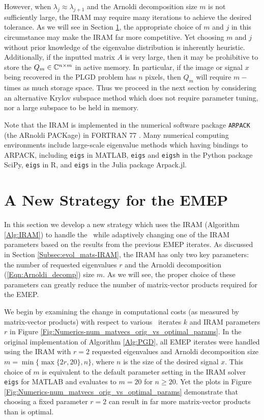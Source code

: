 However, when $\lambda_j \approx \lambda_{j+1}$ and the Arnoldi decomposition size $m$ is not sufficiently large, the IRAM may require many iterations to achieve the desired tolerance. 
 As we will see in Section \ref{Subsec:evol_mats-adaptive_IRAM}, the appropriate choice of $m$ and $j$ in this circumstance may make the IRAM far more competitive.  
Yet choosing $m$ and $j$ without prior knowledge of the eigenvalue distribution is inherently heuristic.  
Additionally, if the inputted matrix $A$ is very large, then it may be prohibitive to store the $Q_m \in {\mathbb C}^{n \times m}$ in active memory.  In particular, if the image or signal $x$ being recovered in the PLGD problem has $n$ pixels, then $Q_m$ will require $m-$times as much storage space.  
Thus we proceed in the next section by considering an alternative Krylov subspace method which does not require parameter tuning, nor a large subspace to be held in memory.


Note that the IRAM is implemented in the numerical software package \texttt{ARPACK} (the ARnoldi PACKage) in FORTRAN 77 \cite{lehoucq1998arpack}.  Many numerical computing environments include large-scale eigenvalue methods which having bindings to ARPACK, including \texttt{eigs} in MATLAB, \texttt{eigs} and \texttt{eigsh} in the Python package SciPy, \texttt{eigs} in R, and \texttt{eigs} in the Julia package Arpack.jl. 







\section{A New Strategy for the EMEP}
\label{Subsec:evol_mats-adaptive_IRAM}


In this section we develop a new strategy which uses the IRAM (Algorithm \ref{Alg:IRAM}) to handle the \emep \ while adaptively changing one of the IRAM parameters based on the results from the previous EMEP iterates.
As discussed in Section \ref{Subsec:evol_mats-IRAM}, the IRAM has only two key parameters: the number of requested eigenvalues $r$ and the Arnoldi decomposition (\ref{Eqn:Arnoldi_decomp}) size $m$.
As we will see, the proper choice of these parameters can greatly reduce the number of matrix-vector products required for the EMEP.


We begin by examining the change in computational costs  (as measured by matrix-vector products) with respect to various \emep \ iterates $k$ and IRAM parameters $r$ in Figure \ref{Fig:Numerics-num_matvecs_orig_vs_optimal_params}.
In the original implementation of Algorithm \ref{Alg:PGD}, all EMEP iterates were handled using the IRAM with $r=2$ requested eigenvalues and Arnoldi decomposition size $m = \min \{  \max \{ 2r, 20 \}, n \}$, where $n$ is the size of the desired signal $x$.  
This choice of $m$ is equivalent to the default parameter setting in the IRAM solver \texttt{eigs} for MATLAB and evaluates to $m=20$ for $n \geq 20$.
Yet the plots in Figure \ref{Fig:Numerics-num_matvecs_orig_vs_optimal_params} demonstrate that choosing a fixed parameter $r=2$ can result in far more matrix-vector products than is optimal.


